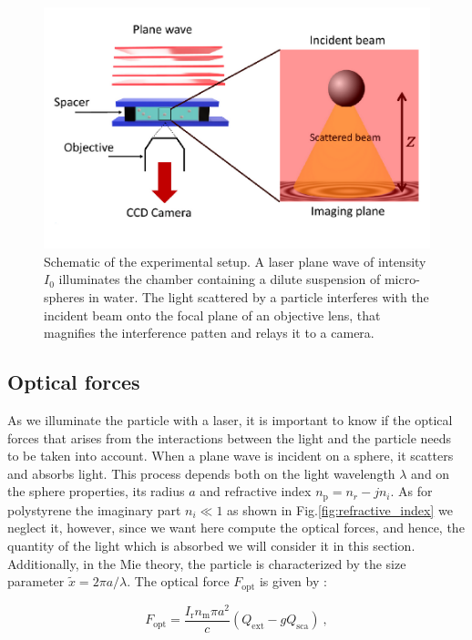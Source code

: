 \begin{figure}[!ht]
	\centering
	\includegraphics[scale=0.9]{02_body/chapter2/images/figures_setup/schema_setup.pdf}
	\caption{Schematic of the experimental setup. A laser plane wave of intensity $I_0$ illuminates the chamber containing a dilute suspension of micro-spheres in water. The light scattered by a particle interferes with the incident beam onto the focal plane of an objective lens, that magnifies the interference patten and relays it to a camera.}
	\label{fig:schema}
\end{figure}


\subsection{Optical forces}

As we illuminate the particle with a laser, it is important to know if the optical forces that arises from the interactions between the light and the particle needs to be taken into account. When a plane wave is incident on a sphere, it scatters and absorbs light. This process depends both on the light wavelength $\lambda$ and on the sphere properties, its radius $a$ and refractive index $n_\mathrm{p} = n_{r} - jn_i$. As for polystyrene the imaginary part $n_i \ll 1$ as shown in Fig.\ref{fig:refractive_index} we neglect it, however, since we want here compute the optical forces, and hence, the quantity of the light which is absorbed we will consider it in this section. Additionally, in the Mie theory, the particle is characterized by the size parameter $\tilde{x}= 2\pi a /\lambda$. The optical force $F_\mathrm{opt}$ is given by \cite{f_bohren_absorption_1998}:

\begin{equation}
	F_\mathrm{opt} = \frac{I_\mathrm{r} n_\mathrm{m} \pi a^2 }{c} (Q_\mathrm{ext} - gQ_\mathrm{sca}) ~,
	\label{Eq.Fopt}
\end{equation}

